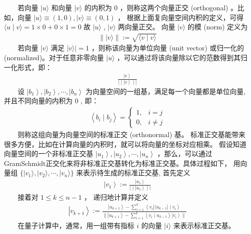 \documentclass[a4paper,11pt,english]{sphinxmanual}
\begin{document}
\sphinxAtStartPar
​  若向量  \(| {u}\rangle\) 和向量  \(| {v}\rangle\) 的内积为 0 ，则称这两个向量正交 (orthogonal) 。比如，向量  \(| {u}\rangle \equiv(1, 0),|v\rangle \equiv(0, 1)\) ， 根据上面复向量空间内积的定义，可得  \(\langle u \mid v\rangle=1 \times 0+0 \times 1=0\) 故  \(| {u}\rangle\) , \(| {v}\rangle\) 两向量正交。 向量  \(|v\rangle\) 的模 (norm) 定义为
\begin{equation*}
\begin{split}\|| v\rangle \|:=\sqrt{\langle v \mid v\rangle}\end{split}
\end{equation*}
\sphinxAtStartPar
​  若向量  \(| {v}\rangle\) 满足  \(| v\rangle |=1\) ，则称该向量为单位向量 (unit vector) 或归一化的 (normalized)。对于任意非零向量  \(| {u}\rangle\) ，可以通过将该向量除以它的范数得到其归一化形式，即：
\begin{equation*}
\begin{split}\frac{\left|v\right\rangle}{\mid\mid\left|v\right\rangle \mid\mid}\end{split}
\end{equation*}
\sphinxAtStartPar
​  设  \(\left|b_{1}\right\rangle,\left|b_{2}\right\rangle, \cdots,\left|b_{n}\right\rangle\) 为向量空间的一组基，满足每一个向量都是单位向量, 并且不同向量的内积为 0 , 即：
\begin{equation*}
\begin{split}\left\langle b_{i} \mid b_{j}\right\rangle= \begin{cases}1, & i=j \\ 0, & i \neq j\end{cases}\end{split}
\end{equation*}
\sphinxAtStartPar
​  则称这组向量为向量空间的标准正交 (orthonormal) 基。 标准正交基能带来很多方便，比如在计算向量的内积时，就可以将向量的坐标对应相乘。 假设知道向量空间的一个非标准正交基  \(\left|u_{1}\right\rangle,\left|u_{2}\right\rangle, \cdots,\left|u_{n}\right\rangle\) ，那么，可以通过Gram\sphinxhyphen{}Schmidt正交化来将非标准正交基转化为标准正交基。具体过程如下， 用向量组  \(\{|v_{1}\rangle,|v_{2}\rangle, \cdots,|v_{n}\rangle\}\) 来表示待生成的标准正交基, 首先定义
\begin{equation*}
\begin{split}\left|v_{1}\right\rangle:=\frac{\left|u_{1}\right\rangle}{\mid\mid\left|u_{1}\right\rangle \mid\mid}\end{split}
\end{equation*}
\sphinxAtStartPar
​  接着对  \(1 \leq k \leq n-1\) ， 递归地计算并定义
\begin{equation*}
\begin{split}\left|v_{k+1}\right\rangle:=\frac{\left|u_{k+1}\right\rangle-\sum_{i=1}^{k}\left\langle v_{i}\left| \langle u_{k-1}\right| \mid v_{i}\right\rangle}{\|\left|u_{k+1}\right\rangle-\sum_{i=1}^{k}\left\langle v_{i} \mid u_{k-1}\right\rangle\left|v_{i}\right\rangle \|}\end{split}
\end{equation*}
\sphinxAtStartPar
​  在量子计算中，通常，用一组带有指标 \(i\) 的向量 \(\mid i\rangle\) 来表示标准正交基。
\end{document}
